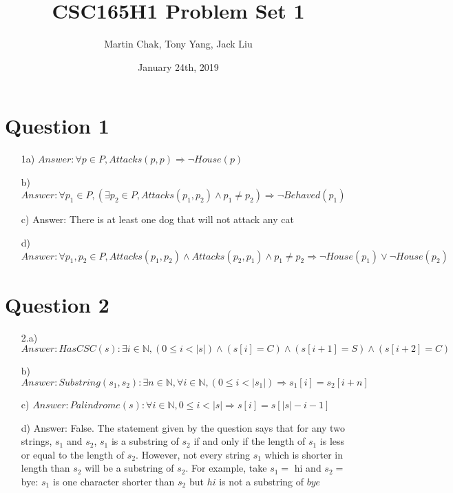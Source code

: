 \documentclass[20pt]{article}
\title{CSC165H1 Problem Set 1}
\author{Martin Chak, Tony Yang, Jack Liu}
\date{January 24th, 2019}
\begin{document}
\maketitle

\section*{Question 1}

\begin{enumerate}

\item[1a)] $Answer: \forall p  \in  P , Attacks(p,p) \Rightarrow \neg House(p)$

\item[b)] $Answer: \forall p_1  \in  P ,(\exists p_2 \in P ,  Attacks(p_1,p_2)  \land  p_1 \neq p_2 )\Rightarrow \neg Behaved(p_1)$

\item[c)] Answer: There is at least one dog that will not attack any cat

\item[d)] $Answer: \forall p_1, p_2 \in P, Attacks(p_1,p_2)\land Attacks(p_2,p_1) \land p_1 \neq p_2 \Rightarrow \neg House(p_1) \lor \neg House(p_2)$

\end{enumerate}


\newpage
\section*{Question 2}

\begin{enumerate}
\item[2.a)] $Answer: HasCSC(s):\exists i \in\mathbb{N}, (0\leq i < |s|)\wedge (s[i] = C) \land (s[i+1] = S) \land (s[i+2] = C)$

\item[b)] $Answer: Substring(s_1, s_2): \exists n\in\mathbb{N},\forall i\in\mathbb{N},  (0\leq i < |s_1|) \Rightarrow s_1[i] = s_2[i + n]$

\item[c)] $Answer: Palindrome(s): \forall i\in\mathbb{N},0\leq i < |s| \Rightarrow s[i]=s[|s|-i-1]$

\item[d)] Answer: False. The statement given by the question says that for any two strings, $s_1$ and $s_2$, $s_1$ is a substring of $s_2$ if and only if the length of $s_1$ is less or equal to the length of $s_2$. However, not every string $s_1$ which is shorter in length than $s_2$ will be a substring of $s_2$. For example, take $s_1=$ hi and $s_2=$ bye: $s_1$ is one character shorter than $s_2$ but $hi$ is not a substring of $bye$

\end{enumerate}
\end{document}
